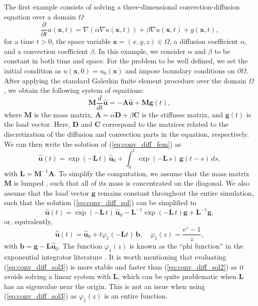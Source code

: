 \documentclass[smallextended]{svjour3}
\renewcommand{\vec}[1]{\mathbf{#1}}
\newcommand{\mat}[1]{\mathbf{#1}}
\begin{document}
The first example consists of solving a three-di\-men\-sional convection-diffusion equation over a domain $\Omega$
\begin{equation}
\label{eq:conv_diff_def}
\frac{\partial}{\partial t} u(\vec{x}, t) = \nabla(\alpha \nabla u(\vec{x}, t)) + \beta \nabla u(\vec{x}, t) + g(\vec{x}, t),
\end{equation}
for a time $t > 0$, the space variable $\vec{x} = (x, y, z) \in \Omega$, a diffusion coefficient $\alpha$, and a convection coefficient $\beta$. In this example, we consider $\alpha$ and $\beta$ to be constant in both time and space. For the problem to be well defined, we set the initial condition as $u(\vec{x}, 0) = u_0(\vec{x})$ and impose boundary conditions on $\partial \Omega$. After applying the standard Galerkin finite element procedure \cite{larson_finite_2013,zienkiewicz_finite_2013} over the domain $\Omega$, we obtain the following system of equations:
\begin{equation}
\label{eq:conv_diff_fem}
\mat{M} \frac{d}{dt} \vec{\hat{u}} = -\mat{A} \vec{\hat{u}} + \mat{M} \vec{g}(t),
\end{equation}
where $\mat{M}$ is the mass matrix, $\mat{A} = \alpha \mat{D} + \beta \mat{C}$ is the stiffness matrix, and $\vec{g}(t)$ is the load vector. Here, $\mat{D}$ and $\mat{C}$ correspond to the matrices related to the discretization of the diffusion and convection parts in the equation, respectively. We can then write the solution of (\ref{eq:conv_diff_fem}) as
\begin{equation}
\label{eq:conv_diff_sol}
\vec{\hat{u}}(t) = \exp(-\mat{L} \, t) \, \vec{\hat{u}}_0 + \int_{0}^{t} \exp(-\mat{L} \, s) \, \vec{g}(t - s) \, ds,
\end{equation}
with $\mat{L} = \mat{M}^{-1}\mat{A}$. To simplify the computation, we assume that the mass matrix $\mat{M}$ is lumped \cite{larson_finite_2013,zienkiewicz_finite_2013}, such that all of its mass is concentrated on the diagonal. We also assume that the load vector $\vec{g}$ remains constant throughout the entire simulation, such that the solution (\ref{eq:conv_diff_sol}) can be simplified to
\begin{equation}
\label{eq:conv_diff_sol2}
\vec{\hat{u}}(t) = \exp(-\mat{L} \, t) \, \vec{\hat{u}}_0 - \mat{L}^{-1} \exp(-\mat{L} \, t) \vec{g} + \mat{L}^{-1} \vec{g},
\end{equation}
or, equivalently,
\begin{equation}
\label{eq:conv_diff_sol3}
\vec{\hat{u}}(t) = \vec{\hat{u}}_0 + t\varphi_1(-\mat{L} t) \, \vec{b}, \quad \varphi_1(z) = \frac{e^z - 1}{z},
\end{equation}
with $\vec{b} = \vec{g} - \mat{L} \vec{\hat{u}}_0$. The function $\varphi_1(z)$ is known as the ``phi function'' in the exponential integrator literature \cite{hochbruck_exponential_2010}. It is worth mentioning that evaluating (\ref{eq:conv_diff_sol3}) is more stable and faster than (\ref{eq:conv_diff_sol2}) as it avoids solving a linear system with $\mat{L}$, which can be quite problematic when $\mat{L}$ has an eigenvalue near the origin. This is not an issue when using (\ref{eq:conv_diff_sol3}) as $\varphi_1(z)$ is an entire function.
\end{document}

